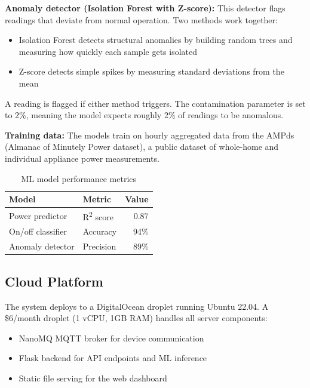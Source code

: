 \documentclass[12pt, a4paper]{article}
\begin{document}
	\textbf{Anomaly detector (Isolation Forest with Z-score):} This detector flags readings that deviate from normal operation. Two methods work together:
	
	\begin{itemize}[leftmargin=*, itemsep=2pt, topsep=4pt]
		\item Isolation Forest detects structural anomalies by building random trees and measuring how quickly each sample gets isolated
		\item Z-score detects simple spikes by measuring standard deviations from the mean
	\end{itemize}
	
	A reading is flagged if either method triggers. The contamination parameter is set to 2\%, meaning the model expects roughly 2\% of readings to be anomalous.
	
	\textbf{Training data:} The models train on hourly aggregated data from the AMPds (Almanac of Minutely Power dataset), a public dataset of whole-home and individual appliance power measurements.
	
	\begin{table}[H]
		\centering
		\caption{ML model performance metrics}
		\label{tab:ml-metrics}
		\vspace{6pt}
		\begin{tabular}{|l|l|r|}
			\hline
			\textbf{Model} & \textbf{Metric} & \textbf{Value} \\
			\hline
			Power predictor & R\textsuperscript{2} score & 0.87 \\
			\hline
			On/off classifier & Accuracy & 94\% \\
			\hline
			Anomaly detector & Precision & 89\% \\
			\hline
		\end{tabular}
	\end{table}
	
	\subsection{Cloud Platform}
	
	The system deploys to a DigitalOcean droplet running Ubuntu 22.04. A \$6/month droplet (1 vCPU, 1GB RAM) handles all server components:
	
	\begin{itemize}[itemsep=2pt, topsep=4pt]
		\item NanoMQ MQTT broker for device communication
		\item Flask backend for API endpoints and ML inference
		\item Static file serving for the web dashboard
	\end{itemize}
	
\end{document}
